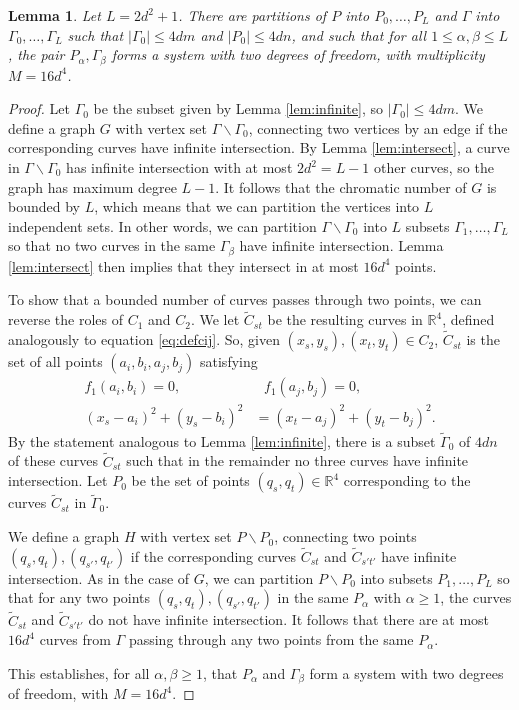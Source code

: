 \documentclass[12pt]{article}
\newtheorem{lemma}[theorem]{Lemma}
\newcommand{\RR}{\mathbb R}
\begin{document}
\begin{lemma}\label{lem:partition}
 Let $L=2d^2+1$.
 There are partitions of $P$ into $P_0,\ldots,P_L$ and 
 $\Gamma$ into $\Gamma_0,\ldots,\Gamma_L$
 such that $|\Gamma_0|\leq 4dm$ and $|P_0| \leq 4dn$,
 and such that for all $1\leq \alpha, \beta \leq L$, 
 the pair $P_\alpha, \Gamma_\beta$ forms a system with two degrees of freedom,
 with multiplicity $M = 16d^4$.
\end{lemma}
\begin{proof}
 Let $\Gamma_0$ be the subset given by Lemma \ref{lem:infinite}, 
 so $|\Gamma_0|\leq 4dm$. 
 We define a graph $G$ with vertex set $\Gamma\backslash \Gamma_0$, 
 connecting two vertices by an edge if the corresponding curves have infinite intersection.
 By Lemma \ref{lem:intersect}, 
 a curve in $\Gamma\backslash \Gamma_0$ has infinite intersection with at most $2d^2 = L-1$ other curves, 
 so the graph has maximum degree $L-1$. 
 It follows that the chromatic number of $G$ is bounded by $L$,
 which means that we can partition the vertices into $L$ independent sets.
 In other words, we can partition $\Gamma\backslash \Gamma_0$ into 
 $L$ subsets $\Gamma_1,\ldots,\Gamma_L$ 
 so that no two curves in the same $\Gamma_\beta$ have infinite intersection.
 Lemma \ref{lem:intersect} then implies that 
 they intersect in at most $16d^4$ points.
 
 To show that a bounded number of curves passes through two points,
 we can reverse the roles of $C_1$ and $C_2$.
 We let $\widetilde{C}_{st}$ be the resulting curves in $\RR^4$, 
 defined analogously to equation \eqref{eq:defcij}.
 So, given $(x_s,y_s),(x_t,y_t)\in C_2$, $\widetilde{C}_{st}$ is 
 the set of all points $(a_i,b_i, a_j,b_j)$ satisfying
 \begin{align*}%
 f_1(a_i,b_i)=0,&~~~f_1(a_j,b_j)=0,\\
 (x_s-a_i)^2 + (y_s-b_i)^2 &= (x_t-a_j)^2 + (y_t-b_j)^2.
 \end{align*}
 By the statement analogous to Lemma \ref{lem:infinite},
 there is a subset $\widetilde{\Gamma}_0$ of $4dn$ of these curves $\widetilde{C}_{st}$ 
 such that in the remainder no three curves have infinite intersection.
 Let $P_0$ be the set of points $(q_s,q_t)\in \RR^4$ 
 corresponding to the curves $\widetilde{C}_{st}$ in $\widetilde{\Gamma}_0$.
 
 We define a graph $H$ with vertex set $P\backslash P_0$,
 connecting two points $(q_s,q_t),(q_{s'},q_{t'})$ 
 if the corresponding curves $\widetilde{C}_{st}$ and $\widetilde{C}_{s't'}$
 have infinite intersection.
 As in the case of $G$, we can partition $P\backslash P_0$ into subsets $P_1,\ldots, P_L$
 so that for any two points $(q_s,q_t),(q_{s'},q_{t'})$ 
 in the same $P_\alpha$ with $\alpha \geq 1$,
 the curves $\widetilde{C}_{st}$ and $\widetilde{C}_{s't'}$
 do not have infinite intersection.
 It follows that there are at most $16d^4$ curves from $\Gamma$ 
 passing through any two points from the same $P_\alpha$.
 
 This establishes, for all $\alpha, \beta\geq 1$,  that $P_\alpha$ and $\Gamma_\beta$ 
 form a system with two degrees of freedom, with $M = 16d^4$.
\end{proof}
\end{document}
